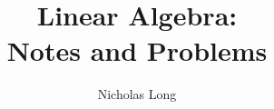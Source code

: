 

\usepackage[all]{xy}
\usepackage{color,graphicx}
%
\InstructorVersion
%
\newcommand\Rn{$\mathbb{R}^n$}
\newcommand\Rm{$\mathbb{R}^m$}
\newcommand\R{$\mathbb{R}$}
\newcommand\bq{\begin{question}}
\newcommand\eq{\end{question}}
\newcommand\be{\begin{enumerate}}
\newcommand\ee{\end{enumerate}}
\newtheorem{question}[theorem]{Question}
\renewcommand{\labelenumi}{\alph{enumi})}
\newcount\colveccount
\newcommand*\colvec[1]{
        \global\colveccount#1
        \begin{bmatrix}
        \colvecnext
}
\def\colvecnext#1{
        #1
        \global\advance\colveccount-1
        \ifnum\colveccount>0
                \\
                \expandafter\colvecnext
        \else
                \end{bmatrix}
        \fi
}


\large
\frontmatter
\title{Linear Algebra: \\
Notes and Problems}
\author{Nicholas Long}
\maketitle
\tableofcontents

